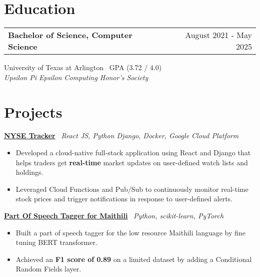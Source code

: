 \documentclass[a4paper,12pt]{article}
\begin{document}
\vspace{-0.7em}
\section{Education}
\noindent
\begin{tabularx}{\linewidth}{@{}Xr@{}}
\textbf{Bachelor of Science, Computer Science} & August 2021 - May 2025 \\
\end{tabularx}
\vspace{0.2em}
University of Texas at Arlington \ GPA (3.72 / 4.0) \\
\textit{Upsilon Pi Epsilon Computing Honor's Society}

\vspace{-0.7em}
\section{Projects}

\vspace{-0.4em}
\href{https://github.com/kilibarda4/nyse-tracker}
{\textbf{NYSE Tracker}} \ \textit{React JS, Python Django, Docker, Google Cloud Platform}
\begin{itemize}
\vspace{-0.4em}
    \item Developed a cloud-native full-stack application using React and Django that helps traders get \textbf{real-time} market updates on user-defined watch lists and holdings.
    \item Leveraged Cloud Functions and Pub/Sub to continuously monitor real-time stock prices and trigger notifications in response to user-defined alerts.
\end{itemize}

\vspace{-0.4em}
\href{https://github.com/kilibarda4/pos-tagger-Maithili}
{\textbf{Part Of Speech Tagger for Maithili}} \ \textit{Python, scikit-learn, PyTorch}
\begin{itemize}
\vspace{-0.4em}
    \item Built a part of speech tagger for the low resource Maithili language by fine tuning BERT transformer.
    \item Achieved an \textbf{F1 score of 0.89} on a limited dataset by adding a Conditional Random Fields layer.
\end{itemize}

\vfill
\end{document}
